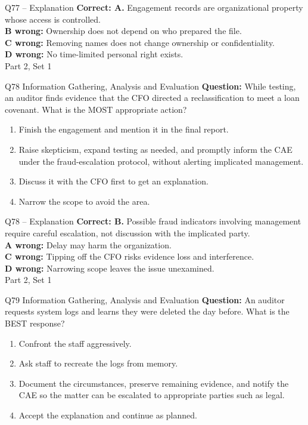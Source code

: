 \documentclass[aspectratio=169,10pt]{beamer}
\begin{document}
\begin{frame}[t]{Q77 -- Explanation}
	\footnotesize
	\textbf{Correct: A.} Engagement records are organizational property whose access is controlled. \\[5pt]
\textbf{B wrong:} Ownership does not depend on who prepared the file. \\[3pt]
\textbf{C wrong:} Removing names does not change ownership or confidentiality. \\[3pt]
\textbf{D wrong:} No time-limited personal right exists. \\[3pt]
	\vfill {\tiny Part 2, Set 1}
\end{frame}
\begin{frame}[t]{Q78 \hfill {\scriptsize Information Gathering, Analysis and Evaluation}}
	\small
	\textbf{Question:} While testing, an auditor finds evidence that the CFO directed a reclassification to meet a loan covenant. What is the MOST appropriate action?
	\begin{enumerate}[label=\Alph*.,itemsep=1pt,topsep=3pt]
			\item Finish the engagement and mention it in the final report.
			\item Raise skepticism, expand testing as needed, and promptly inform the CAE under the fraud-escalation protocol, without alerting implicated management.
			\item Discuss it with the CFO first to get an explanation.
			\item Narrow the scope to avoid the area.
	\end{enumerate}
\end{frame}
\begin{frame}[t]{Q78 -- Explanation}
	\footnotesize
	\textbf{Correct: B.} Possible fraud indicators involving management require careful escalation, not discussion with the implicated party. \\[5pt]
\textbf{A wrong:} Delay may harm the organization. \\[3pt]
\textbf{C wrong:} Tipping off the CFO risks evidence loss and interference. \\[3pt]
\textbf{D wrong:} Narrowing scope leaves the issue unexamined. \\[3pt]
	\vfill {\tiny Part 2, Set 1}
\end{frame}
\begin{frame}[t]{Q79 \hfill {\scriptsize Information Gathering, Analysis and Evaluation}}
	\small
	\textbf{Question:} An auditor requests system logs and learns they were deleted the day before. What is the BEST response?
	\begin{enumerate}[label=\Alph*.,itemsep=1pt,topsep=3pt]
			\item Confront the staff aggressively.
			\item Ask staff to recreate the logs from memory.
			\item Document the circumstances, preserve remaining evidence, and notify the CAE so the matter can be escalated to appropriate parties such as legal.
			\item Accept the explanation and continue as planned.
	\end{enumerate}
\end{frame}
\end{document}
